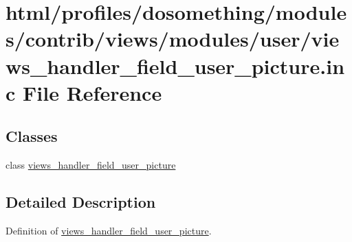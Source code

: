 \hypertarget{views__handler__field__user__picture_8inc}{
\section{html/profiles/dosomething/modules/contrib/views/modules/user/views\_\-handler\_\-field\_\-user\_\-picture.inc File Reference}
\label{views__handler__field__user__picture_8inc}
}
\subsection*{Classes}
\begin{DoxyCompactItemize}
\item 
class \hyperlink{classviews__handler__field__user__picture}{views\_\-handler\_\-field\_\-user\_\-picture}
\end{DoxyCompactItemize}


\subsection{Detailed Description}
Definition of \hyperlink{classviews__handler__field__user__picture}{views\_\-handler\_\-field\_\-user\_\-picture}. 